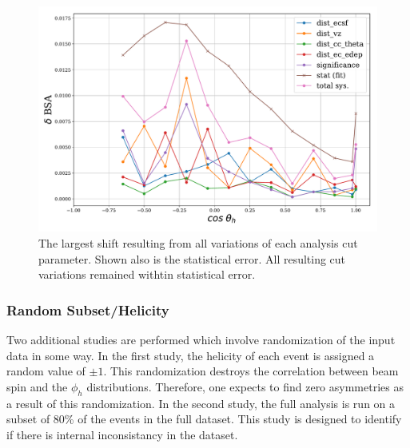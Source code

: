 \begin{figure}
  \begin{center}
    \includegraphics[width=\columnwidth]{image/systematics.pdf}
    \caption{The largest shift resulting from all variations of each analysis cut parameter.  Shown also is the statistical error.  All resulting cut variations remained withtin statistical error.}
  \end{center}
\end{figure}

\subsubsection{Random Subset/Helicity}

Two additional studies are performed which involve randomization of the input data in some way.  In the first study, the helicity of each event is assigned a random value of $\pm 1$.  This randomization destroys the correlation between beam spin and the $\phi_h$ distributions.  Therefore, one expects to find zero asymmetries as a result of this randomization.  In the second study, the full analysis is run on a subset of 80\% of the events in the full dataset.  This study is designed to identify if there is internal inconsistancy in the dataset.
\\

